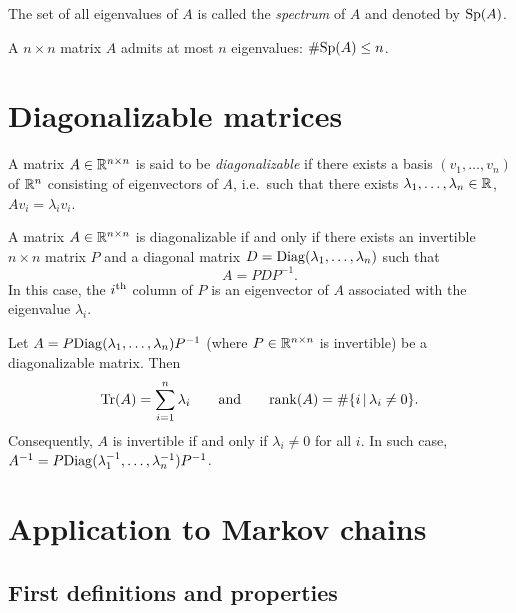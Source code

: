 \documentclass[11pt,nocut]{article}
\begin{document}
\begin{definition}
	The set of all eigenvalues of $A$ is called the \emph{spectrum} of $A$ and denoted by ${{\rm Sp}}(A)$.
\end{definition}

\begin{proposition}
	A $n \times n$ matrix $A$ admits at most $n$ eigenvalues: $\# {{\rm Sp}}(A) \leq n$.
\end{proposition}

\section{Diagonalizable matrices}

\begin{definition}
	A matrix $A \in \mathbb{R}^{n \times n}$ is said to be \emph{diagonalizable} if there exists a basis $(v_1, \dots, v_n)$ of $\mathbb{R}^n$ consisting of eigenvectors of $A$, i.e.\ such that there exists $\lambda_1, \dots, \lambda_n \in \mathbb{R}$, $Av_i = \lambda_i v_i$.
\end{definition}

\begin{proposition}\label{prop:diag}
	A matrix $A \in \mathbb{R}^{n \times n}$ is diagonalizable if and only if there exists an invertible $n \times n$ matrix $P$ and a diagonal matrix $D = {{\rm Diag}}(\lambda_1, \dots, \lambda_n)$ such that
	$$
	A = P D P^{-1}.
	$$
	In this case, the $i^{\rm th}$ column of $P$ is an eigenvector of $A$ associated with the eigenvalue $\lambda_i$.
\end{proposition}

\begin{proposition}
	Let $A = P {{\rm Diag}}(\lambda_1,\dots,\lambda_n) P^{-1}$ (where $P \in \mathbb{R}^{n \times n}$ is invertible) be a diagonalizable matrix. Then
$$
{{\rm Tr}}(A) = \sum_{i=1}^n \lambda_i
\qquad \text{and} \qquad
{{\rm rank}}(A) = \# \{ i \, | \, \lambda_i \neq 0 \}.
$$
Consequently, $A$ is invertible if and only if $\lambda_i \neq 0$ for all $i$. In such case, $A^{-1} = P {{\rm Diag}}(\lambda_1^{-1}, \dots, \lambda_n^{-1}) P^{-1}$.
\end{proposition}

\section{Application to Markov chains}

\subsection{First definitions and properties}
\end{document}
